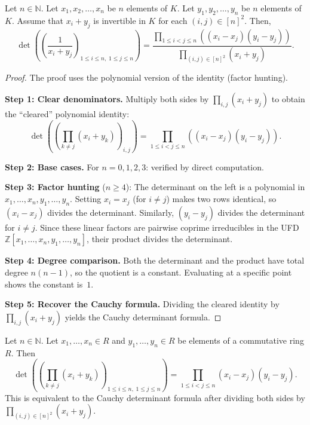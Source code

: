 \begin{theorem}
\label{thm.det.cauchy}
\leantarget
\leanok
Let $n \in \mathbb{N}$. Let $x_1, x_2, \ldots, x_n$ be $n$ elements of $K$.
Let $y_1, y_2, \ldots, y_n$ be $n$ elements of $K$.
Assume that $x_i + y_j$ is invertible in $K$ for each $(i, j) \in [n]^2$. Then,
\[
  \det\left( \left( \frac{1}{x_i + y_j} \right)_{1 \leq i \leq n,\; 1 \leq j \leq n}
  \right)
  = \frac{\prod_{1 \leq i < j \leq n} \left( (x_i - x_j)(y_i - y_j) \right)}{
          \prod_{(i,j) \in [n]^2} (x_i + y_j)}.
\]
\end{theorem}

\begin{proof}
The proof uses the polynomial version of the identity (factor hunting).

\textbf{Step 1: Clear denominators.}
Multiply both sides by $\prod_{i,j}(x_i + y_j)$ to obtain the ``cleared''
polynomial identity:
\[
  \det\!\left(\left(\prod_{k \neq j}(x_i + y_k)\right)_{i,j}\right)
  = \prod_{1 \leq i < j \leq n}\left((x_i - x_j)(y_i - y_j)\right).
\]

\textbf{Step 2: Base cases.}
For $n = 0, 1, 2, 3$: verified by direct computation.

\textbf{Step 3: Factor hunting} ($n \geq 4$):
The determinant on the left is a polynomial in $x_1, \ldots, x_n, y_1, \ldots, y_n$.
Setting $x_i = x_j$ (for $i \neq j$) makes two rows identical, so
$(x_i - x_j)$ divides the determinant.
Similarly, $(y_i - y_j)$ divides the determinant for $i \neq j$.
Since these linear factors are pairwise coprime irreducibles in the UFD
$\mathbb{Z}[x_1, \ldots, x_n, y_1, \ldots, y_n]$, their product divides
the determinant.

\textbf{Step 4: Degree comparison.}
Both the determinant and the product have total degree $n(n-1)$, so the
quotient is a constant. Evaluating at a specific point shows the constant
is~$1$.

\textbf{Step 5: Recover the Cauchy formula.}
Dividing the cleared identity by $\prod_{i,j}(x_i + y_j)$ yields the
Cauchy determinant formula.
\end{proof}

\begin{lemma}
\label{lem.det.cauchy-poly}
\leanhelper
\leanok
Let $n \in \mathbb{N}$. Let $x_1, \ldots, x_n \in R$ and $y_1, \ldots, y_n \in R$
be elements of a commutative ring $R$. Then
\[
  \det\left( \left( \prod_{k \neq j} (x_i + y_k) \right)_{1 \leq i \leq n,\; 1 \leq j \leq n} \right)
  = \prod_{1 \leq i < j \leq n} (x_i - x_j)(y_i - y_j).
\]
This is equivalent to the Cauchy determinant formula after dividing both sides
by $\prod_{(i,j) \in [n]^2} (x_i + y_j)$.
\end{lemma}

